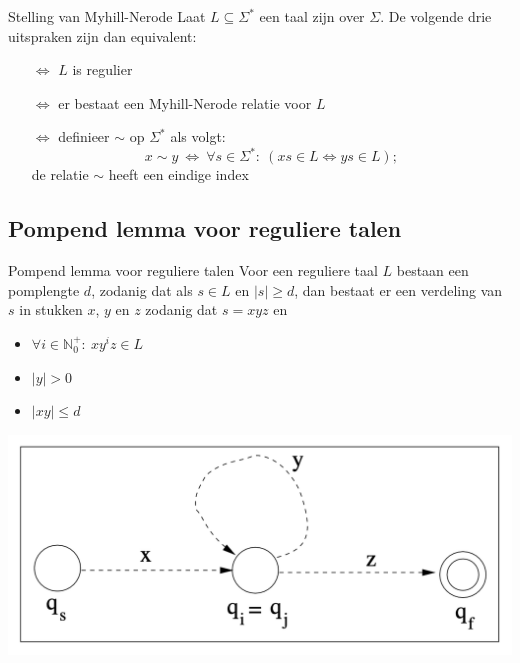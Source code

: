 \begin{lem}{Stelling van Myhill-Nerode}
    Laat $L \subseteq \Sigma^*$ een taal zijn over $\Sigma$. De volgende drie uitspraken zijn dan equivalent:
    \begin{itemize}
        \item[$\Leftrightarrow$] $L$ is regulier
        \item[$\Leftrightarrow$] er bestaat een Myhill-Nerode relatie voor $L$
        \item[$\Leftrightarrow$] 
            definieer $\sim$ op $\Sigma^*$ als volgt:
            \begin{equation*}
                x \sim y \ \Leftrightarrow \ \forall s \in \Sigma^*: \ ( xs \in L \Leftrightarrow ys \in L );
            \end{equation*}
            de relatie $\sim$ heeft een eindige index
    \end{itemize}
    \vspace{-0.3cm}
\end{lem}   

\subsection{Pompend lemma voor reguliere talen}

\vspace{0.5cm}

\begin{lem}{Pompend lemma voor reguliere talen}
    Voor een reguliere taal $L$ bestaan een pomplengte $d$, zodanig dat als $s \in L$ en $|s| \geq d$, 
    dan bestaat er een verdeling van $s$ in stukken $x$, $y$ en $z$ zodanig dat $s = xyz$ en \\
    \begin{minipage}{0.56\textwidth}
        \begin{itemize}
            \item $\forall i \in \mathbb{N}_0^+: \ xy^iz \in L$
            \item $|y| > 0$
            \item $|xy| \leq d$
        \end{itemize}
    \end{minipage}
    \begin{minipage}{0.4\textwidth}
       \hspace{1.25cm}\includegraphics[scale = 0.275]{Images/VerdelingStrings.png}
    \end{minipage}
    \vspace{-0.3cm}
\end{lem}

